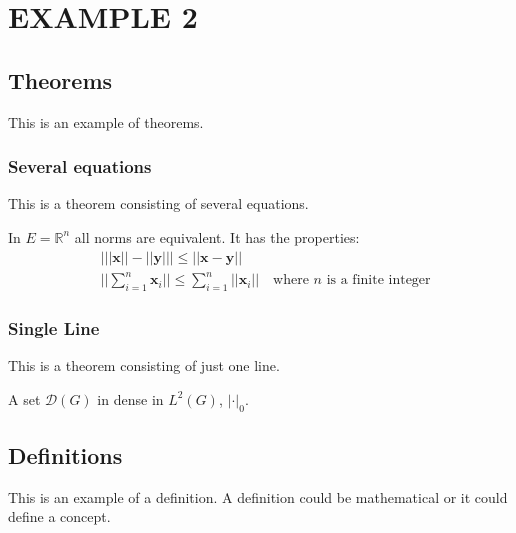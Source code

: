 \documentclass[11pt,fleqn,openany]{book} %
\begin{document}

\chapter{EXAMPLE 2}

\section{Theorems}

This is an example of theorems.

\subsection{Several equations}
This is a theorem consisting of several equations.

\begin{theorem}
In $E=\mathbb{R}^n$ all norms are equivalent. It has the properties:
\begin{align}
& \big| ||\mathbf{x}|| - ||\mathbf{y}|| \big|\leq || \mathbf{x}- \mathbf{y}||\\
&  ||\sum_{i=1}^n\mathbf{x}_i||\leq \sum_{i=1}^n||\mathbf{x}_i||\quad\text{where $n$ is a finite integer}
\end{align}
\end{theorem}

\subsection{Single Line}
This is a theorem consisting of just one line.

\begin{theorem}
A set $\mathcal{D}(G)$ in dense in $L^2(G)$, $|\cdot|_0$. 
\end{theorem}


\section{Definitions}

This is an example of a definition. A definition could be mathematical or it could define a concept.
\end{document}
